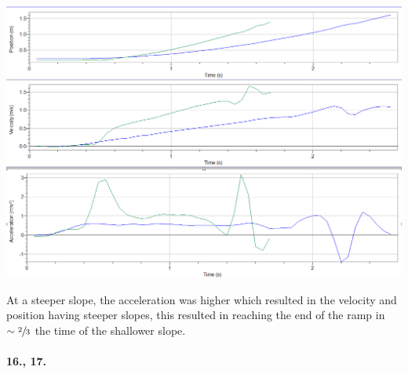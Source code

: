    \begin{mdframed}
        {\centering\includegraphics[width=\textwidth]{image14}}

        At a steeper slope, the acceleration was higher which resulted in the velocity and position having steeper slopes, this resulted in reaching the end of the ramp in $\sim\sfrac{2}{3}$ the time of the shallower slope.
    \end{mdframed}

    \pagebreak

    \paragraph*{16., 17.}
    
